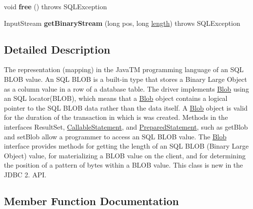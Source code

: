\begin{DoxyCompactItemize}
\item 
\mbox{\label{classcom_1_1mysql_1_1jdbc_1_1_blob_from_locator_abe54aa46d5577f1325815bee666f27fc}} 
void {\bfseries free} ()  throws S\+Q\+L\+Exception 
\item 
\mbox{\label{classcom_1_1mysql_1_1jdbc_1_1_blob_from_locator_a7d5f8ff953a26824c06bdea7cd9be739}} 
Input\+Stream {\bfseries get\+Binary\+Stream} (long pos, long \mbox{\hyperlink{classcom_1_1mysql_1_1jdbc_1_1_blob_from_locator_a9fc208b550f8dfde5f07b1762e5db586}{length}})  throws S\+Q\+L\+Exception 
\end{DoxyCompactItemize}


\subsection{Detailed Description}
The representation (mapping) in the Java\+TM programming language of an S\+QL B\+L\+OB value. An S\+QL B\+L\+OB is a built-\/in type that stores a Binary Large Object as a column value in a row of a database table. The driver implements \mbox{\hyperlink{classcom_1_1mysql_1_1jdbc_1_1_blob}{Blob}} using an S\+QL locator(\+B\+L\+O\+B), which means that a \mbox{\hyperlink{classcom_1_1mysql_1_1jdbc_1_1_blob}{Blob}} object contains a logical pointer to the S\+QL B\+L\+OB data rather than the data itself. A \mbox{\hyperlink{classcom_1_1mysql_1_1jdbc_1_1_blob}{Blob}} object is valid for the duration of the transaction in which is was created. Methods in the interfaces Result\+Set, \mbox{\hyperlink{classcom_1_1mysql_1_1jdbc_1_1_callable_statement}{Callable\+Statement}}, and \mbox{\hyperlink{classcom_1_1mysql_1_1jdbc_1_1_prepared_statement}{Prepared\+Statement}}, such as get\+Blob and set\+Blob allow a programmer to access an S\+QL B\+L\+OB value. The \mbox{\hyperlink{classcom_1_1mysql_1_1jdbc_1_1_blob}{Blob}} interface provides methods for getting the length of an S\+QL B\+L\+OB (Binary Large Object) value, for materializing a B\+L\+OB value on the client, and for determining the position of a pattern of bytes within a B\+L\+OB value. This class is new in the J\+D\+BC 2. A\+PI. 

\subsection{Member Function Documentation}
\mbox{\label{classcom_1_1mysql_1_1jdbc_1_1_blob_from_locator_a44883808ac8f47fae08435ac5ddcc6b6}} 
